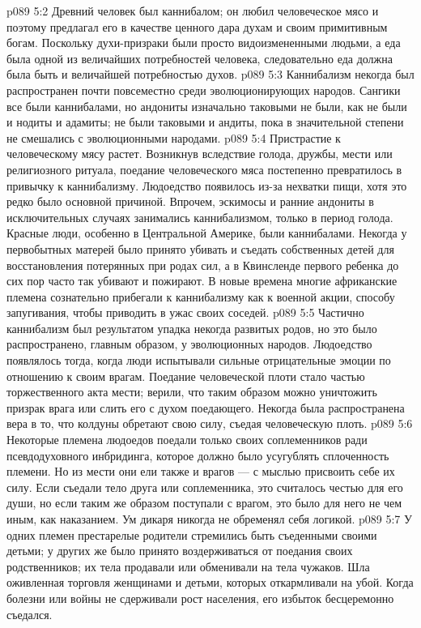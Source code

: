 \vs p089 5:2 Древний человек был каннибалом; он любил человеческое мясо и поэтому предлагал его в качестве ценного дара духам и своим примитивным богам. Поскольку духи\hyp{}призраки были просто видоизмененными людьми, а еда была одной из величайших потребностей человека, следовательно еда должна была быть и величайшей потребностью духов.
\vs p089 5:3 Каннибализм некогда был распространен почти повсеместно среди эволюционирующих народов. Сангики все были каннибалами, но андониты изначально таковыми не были, как не были и нодиты и адамиты; не были таковыми и андиты, пока в значительной степени не смешались с эволюционными народами.
\vs p089 5:4 Пристрастие к человеческому мясу растет. Возникнув вследствие голода, дружбы, мести или религиозного ритуала, поедание человеческого мяса постепенно превратилось в привычку к каннибализму. Людоедство появилось из\hyp{}за нехватки пищи, хотя это редко было основной причиной. Впрочем, эскимосы и ранние андониты в исключительных случаях занимались каннибализмом, только в период голода. Красные люди, особенно в Центральной Америке, были каннибалами. Некогда у первобытных матерей было принято убивать и съедать собственных детей для восстановления потерянных при родах сил, а в Квинсленде первого ребенка до сих пор часто так убивают и пожирают. В новые времена многие африканские племена сознательно прибегали к каннибализму как к военной акции, способу запугивания, чтобы приводить в ужас своих соседей.
\vs p089 5:5 Частично каннибализм был результатом упадка некогда развитых родов, но это было распространено, главным образом, у эволюционных народов. Людоедство появлялось тогда, когда люди испытывали сильные отрицательные эмоции по отношению к своим врагам. Поедание человеческой плоти стало частью торжественного акта мести; верили, что таким образом можно уничтожить призрак врага или слить его с духом поедающего. Некогда была распространена вера в то, что колдуны обретают свою силу, съедая человеческую плоть.
\vs p089 5:6 Некоторые племена людоедов поедали только своих соплеменников ради псевдодуховного инбридинга, которое должно было усугублять сплоченность племени. Но из мести они ели также и врагов --- с мыслью присвоить себе их силу. Если съедали тело друга или соплеменника, это считалось честью для его души, но если таким же образом поступали с врагом, это было для него не чем иным, как наказанием. Ум дикаря никогда не обременял себя логикой.
\vs p089 5:7 У одних племен престарелые родители стремились быть съеденными своими детьми; у других же было принято воздерживаться от поедания своих родственников; их тела продавали или обменивали на тела чужаков. Шла оживленная торговля женщинами и детьми, которых откармливали на убой. Когда болезни или войны не сдерживали рост населения, его избыток бесцеремонно съедался.

